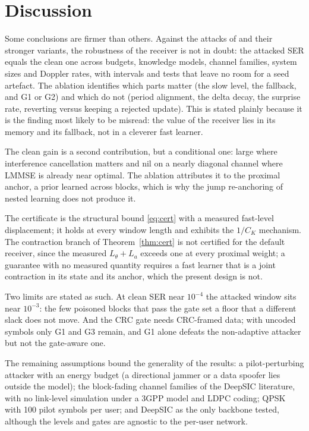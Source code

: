 \documentclass[journal]{IEEEtran}
\begin{document}
\section{Discussion}\label{sec:discussion}
Some conclusions are firmer than others. Against the attacks of \cite{wu2024} and their
stronger variants, the robustness of the receiver is not in doubt: the attacked SER
equals the clean one across budgets, knowledge models, channel families, system sizes
and Doppler rates, with intervals and tests that leave no room for a seed artefact. The ablation identifies which parts matter (the
slow level, the fallback, and G1 or G2) and which do not (period alignment, the delta
decay, the surprise rate, reverting versus keeping a rejected update). This is stated
plainly because it is the finding most likely to be misread: the value of the receiver
lies in its memory and its fallback, not in a cleverer fast learner.

The clean gain is a second contribution, but a conditional one: large where interference
cancellation matters and nil on a nearly diagonal channel where LMMSE is already near
optimal. The ablation attributes it to the proximal anchor, a prior learned across
blocks, which is why the jump re-anchoring of nested learning does not produce it.

The certificate is the structural bound \eqref{eq:cert} with a measured fast-level
displacement; it holds at every window length and exhibits the $1/C_K$ mechanism. The
contraction branch of Theorem~\ref{thm:cert} is not certified for the default receiver,
since the measured $L_\theta+L_a$ exceeds one at every proximal weight; a guarantee with
no measured quantity requires a fast learner that is a joint contraction in its state and
its anchor, which the present design is not.

Two limits are stated as such. At clean SER near $10^{-4}$ the attacked window sits near
$10^{-3}$: the few poisoned blocks that pass the gate set a floor that a different slack
does not move. And the CRC gate needs CRC-framed data; with uncoded symbols only G1 and
G3 remain, and G1 alone defeats the non-adaptive attacker but not the gate-aware one.

The remaining assumptions bound the generality of the results: a pilot-perturbing
attacker with an energy budget (a directional jammer or a data spoofer lies outside the
model); the block-fading channel families of the DeepSIC literature, with no link-level
simulation under a 3GPP model and LDPC coding; QPSK with 100 pilot symbols per user; and
DeepSIC as the only backbone tested, although the levels and gates are agnostic to the
per-user network.
\end{document}
